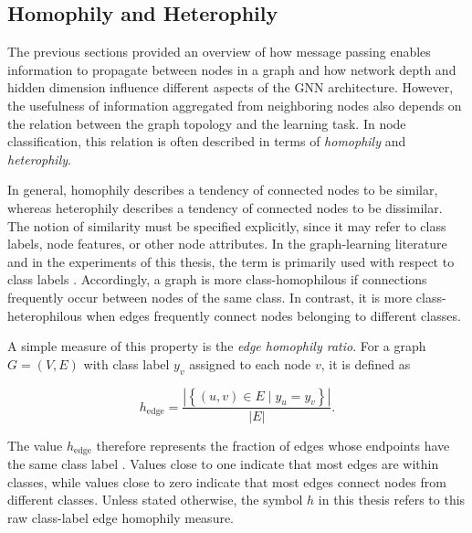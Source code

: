 \documentclass[english]{lni}
\begin{document}

\subsection{Homophily and Heterophily}
\label{sec:homophily-heterophily}

The previous sections provided an overview of how message passing enables information to propagate between nodes in a graph and how network depth and hidden dimension influence different aspects of the GNN architecture. However, the usefulness of information aggregated from neighboring nodes also depends on the relation between the graph topology and the learning task. In node classification, this relation is often described in terms of \emph{homophily} and \emph{heterophily}.

In general, homophily describes a tendency of connected nodes to be similar, whereas heterophily describes a tendency of connected nodes to be dissimilar. The notion of similarity must be specified explicitly, since it may refer to class labels, node features, or other node attributes. In the graph-learning literature and in the experiments of this thesis, the term is primarily used with respect to class labels \cite{zhu2020heterophily,arnaiz2026demystifying}. Accordingly, a graph is more class-homophilous if connections frequently occur between nodes of the same class. In contrast, it is more class-heterophilous when edges frequently connect nodes belonging to different classes.

A simple measure of this property is the \emph{edge homophily ratio}.
For a graph $G=(V,E)$ with class label $y_v$ assigned to each node
$v$, it is defined as

\begin{equation}
    h_{\mathrm{edge}}
    =
    \frac{
        \left|
            \left\{
                (u,v)\in E
                \mid
                y_u = y_v
            \right\}
        \right|
    }{|E|}.
    \label{eq:edge-homophily}
\end{equation}

The value $h_{\mathrm{edge}}$ therefore represents the fraction of
edges whose endpoints have the same class label
\cite{zhu2020heterophily,platonov2023critical}. Values close to one
indicate that most edges are within classes, while values close to
zero indicate that most edges connect nodes from different classes.
Unless stated otherwise, the symbol $h$ in this thesis refers to this
raw class-label edge homophily measure.
\end{document}
